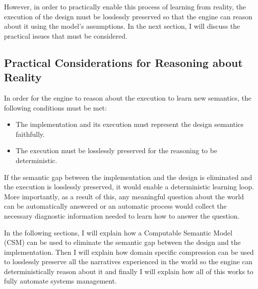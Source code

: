 However, in order to practically enable this process of learning from reality, the execution of the design must be losslessly preserved so that the engine can reason about it using the model's assumptions. In the next section, I will discuss the practical issues that must be considered.

\subsection{Practical Considerations for Reasoning about Reality}

In order for the engine to reason about the execution to learn new semantics, the following conditions must be met:
\begin{itemize}
    \item The implementation and its execution must represent the design semantics faithfully.
    \item The execution must be losslessly preserved for the reasoning to be deterministic.
\end{itemize}

If the semantic gap between the implementation and the design is eliminated and the execution is losslessly preserved, it would enable a deterministic learning loop. More importantly, as a result of this, any meaningful question about the world can be automatically answered or an automatic process would collect the necessary diagnostic information needed to learn how to answer the question.

In the following sections, I will explain how a Computable Semantic Model (CSM) can be used to eliminate the semantic gap between the design and the implementation. Then I will explain how domain specific compression can be used to losslessly preserve all the narratives experienced in the world so the engine can deterministically reason about it and finally I will explain how all of this works to fully automate systems management.